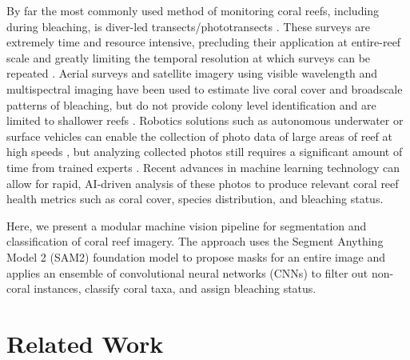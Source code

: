 \documentclass[11pt]{elsarticle}
\begin{document}
By far the most commonly used method of monitoring coral reefs, including during bleaching, is diver-led transects/phototransects \citep{rivera2025}. These surveys are extremely time and resource intensive, precluding their application at entire-reef scale and greatly limiting the temporal resolution at which surveys can be repeated \citep{cresswell2021,mcdonald2010}. Aerial surveys and satellite imagery using visible wavelength and multispectral imaging have been used to estimate live coral cover and broadscale patterns of bleaching, but do not provide colony level identification and are limited to shallower reefs \citep{asner2022,ayad2025}. Robotics solutions such as autonomous underwater or surface vehicles can enable the collection of photo data of large areas of reef at high speeds \citep{raber2019}, but analyzing collected photos still requires a significant amount of time from trained experts \citep{josephitis2012}. Recent advances in machine learning technology can allow for rapid, AI-driven analysis of these photos to produce relevant coral reef health metrics such as coral cover, species distribution, and bleaching status.

Here, we present a modular machine vision pipeline for segmentation and classification of coral reef imagery. The approach uses the Segment Anything Model 2 (SAM2) \citep{ravi2024sam2} foundation model to propose masks for an entire image and applies an ensemble of convolutional neural networks (CNNs) to filter out non-coral instances, classify coral taxa, and assign bleaching status.


\section{Related Work}
\end{document}
